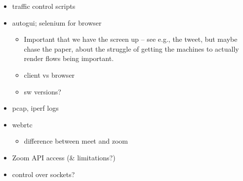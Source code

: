 \begin{itemize}
    \item traffic control scripts
    \item autogui; selenium for browser
          \begin{itemize}
              \item Important that we have the screen up -- see e.g., the tweet, but maybe chase the paper, about the struggle of getting the machines to actually render flows being important.
              \item client vs browser
              \item sw versions?
          \end{itemize}
    \item pcap, iperf logs
    \item webrtc
          \begin{itemize}
              \item difference between meet and zoom 
          \end{itemize}
    \item Zoom API access (\& limitations?)
    \item control over sockets?
\end{itemize}


